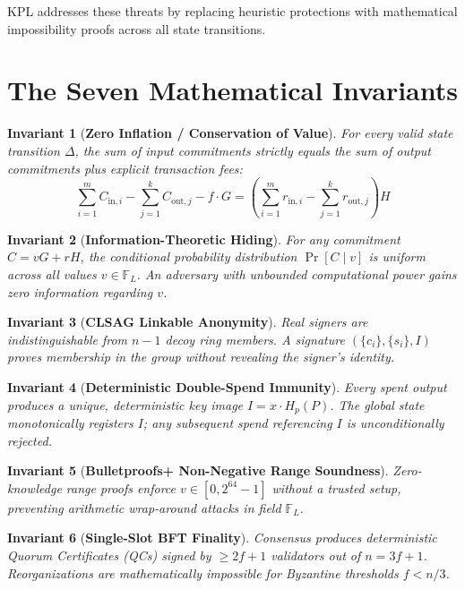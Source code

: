 \documentclass[11pt,a4paper]{article}
\newtheorem{invariant}{Invariant}
\begin{document}
KPL addresses these threats by replacing heuristic protections with mathematical impossibility proofs across all state transitions.

\section{The Seven Mathematical Invariants}

\begin{invariant}[\textbf{Zero Inflation / Conservation of Value}]
For every valid state transition $\Delta$, the sum of input commitments strictly equals the sum of output commitments plus explicit transaction fees:
\begin{equation}
\sum_{i=1}^m C_{\text{in}, i} - \sum_{j=1}^k C_{\text{out}, j} - f \cdot G = \left( \sum_{i=1}^m r_{\text{in}, i} - \sum_{j=1}^k r_{\text{out}, j} \right) H
\end{equation}
\end{invariant}

\begin{invariant}[\textbf{Information-Theoretic Hiding}]
For any commitment $C = vG + rH$, the conditional probability distribution $\Pr[C \mid v]$ is uniform across all values $v \in \mathbb{F}_L$. An adversary with unbounded computational power gains zero information regarding $v$.
\end{invariant}

\begin{invariant}[\textbf{CLSAG Linkable Anonymity}]
Real signers are indistinguishable from $n-1$ decoy ring members. A signature $(\{c_i\}, \{s_i\}, I)$ proves membership in the group without revealing the signer's identity.
\end{invariant}

\begin{invariant}[\textbf{Deterministic Double-Spend Immunity}]
Every spent output produces a unique, deterministic key image $I = x \cdot H_p(P)$. The global state monotonically registers $I$; any subsequent spend referencing $I$ is unconditionally rejected.
\end{invariant}

\begin{invariant}[\textbf{Bulletproofs+ Non-Negative Range Soundness}]
Zero-knowledge range proofs enforce $v \in [0, 2^{64}-1]$ without a trusted setup, preventing arithmetic wrap-around attacks in field $\mathbb{F}_L$.
\end{invariant}

\begin{invariant}[\textbf{Single-Slot BFT Finality}]
Consensus produces deterministic Quorum Certificates (QCs) signed by $\ge 2f + 1$ validators out of $n = 3f + 1$. Reorganizations are mathematically impossible for Byzantine thresholds $f < n/3$.
\end{invariant}
\end{document}
